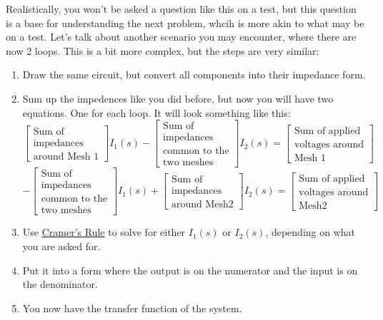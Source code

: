 \documentclass{article}
\theoremstyle{mytheoremstyle}
\theoremstyle{mytheoremstyle}
\theoremstyle{myproblemstyle}
\theoremstyle{break}
\begin{document}
Realistically, you won't be asked a question like this on a test, but this question is a base for understanding the next problem, whcih is more akin to what may be on a test. Let's talk about another scenario you may encounter, where there are now 2 loops. This is a bit more complex, but the steps are very similar:

\begin{enumerate}
	\item Draw the same circuit, but convert all components into their impedance form.
	\item Sum up the impedences like you did before, but now you will have two equations. One for each loop. It will look something like this:
	\begin{equation}
		\left.\left[\begin{array}{c}\text{Sum of}\\\text{impedances}\\\text{around Mesh 1}\end{array}\right.\right]I_1(s)-\left[\begin{array}{c}\text{Sum of}\\\text{impedances}\\\text{common to the}\\\text{two meshes}\end{array}\right]I_2(s)=\left[\begin{array}{c}\text{Sum of applied}\\\text{voltages around}\\\text{Mesh 1}\end{array}\right]
	\end{equation}
	\begin{equation}
		-\begin{bmatrix}\text{Sum of}\\\text{impedances}\\\text{common to the}\\\text{two meshes}\end{bmatrix}I_1(s)+\begin{bmatrix}\text{Sum of}\\\text{impedances}\\\text{around Mesh}2\end{bmatrix}I_2(s)=\begin{bmatrix}\text{Sum of applied}\\\text{voltages around}\\\text{Mesh}2\end{bmatrix}
	\end{equation}
	\item Use \hyperref[subsec:Cramers_Rule]{Cramer's Rule} to solve for either $I_1(s)$ or $I_2(s)$, depending on what you are asked for.
	\item Put it into a form where the output is on the numerator and the input is on the denominator.
	\item You now have the transfer function of the system.
\end{enumerate}
\end{document}
